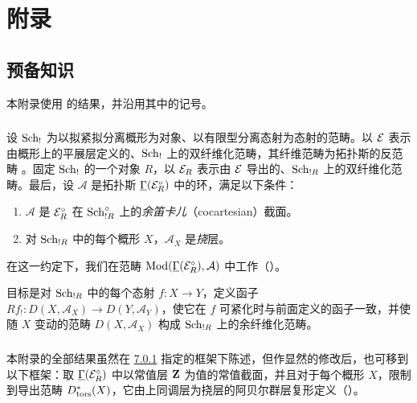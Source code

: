 \section{附录}\pageoriginale

\setcounter{subsection}{-1}
\subsection{预备知识}

本附录使用  的结果，并沿用其中的记号。

\subsubsection{}
设 $\operatorname{Sch}_{!}$ 为以拟紧拟分离概形为对象、以有限型分离态射为态射的范畴。以 ${\mathcal E}$ 表示由概形上的平展层定义的、$\operatorname{Sch}_{!}$ 上的双纤维化范畴，其纤维范畴为拓扑斯的反范畴 。固定 $\operatorname{Sch}_{!}$ 的一个对象 $R$，以 ${\mathcal E}_{R}$ 表示由 ${\mathcal E}$ 导出的、$\operatorname{Sch}_{!R}$ 上的双纤维化范畴。最后，设 $\mathcal{A}$ 是拓扑斯 $\underline{\Gamma}({\mathcal E}^{\circ}_{R})$ 中的环，满足以下条件：
\begin{enumerate}
\renewcommand{\theenumi}{\roman{enumi}}
\renewcommand{\labelenumi}{(\theenumi)}
\item $\mathcal{A}$ 是 ${\mathcal E}^{\circ}_{R}$ 在 $\operatorname{Sch}^{\circ}_{!R}$ 上的\emph{余笛卡儿}（cocartesian）截面。

\item 对 $\operatorname{Sch}_{!R}$ 中的每个概形 $X$，$\mathcal{A}_{X}$ 是\emph{挠}层。
\end{enumerate}

在这一约定下，我们在范畴 $\protect\mathcal{\operatorname{Mod}}(\underline{\Gamma}({\mathcal E}^{\circ}_{R}),\mathcal{A})$ 中工作（）。

目标是对 $\operatorname{Sch}_{!R}$ 中的每个态射 $f:X\rightarrow Y$，定义函子 $Rf_{!}:D(X,\mathcal{A}_X)\rightarrow
D(Y,\mathcal{A}_{Y})$，使它在 $f$ 可紧化时与前面定义的函子一致，并使随 $X$ 变动的范畴 $D(X,\mathcal{A}_{X})$ 构成 $\operatorname{Sch}_{!R}$ 上的余纤维化范畴。

\subsubsection{}
本附录的全部结果虽然在 \hyperref[XVII.subsubsec7.0.1]{7.0.1} 指定的框架下陈述，但作显然的修改后，也可移到以下框架：取 $\underline{\Gamma}({\mathcal E}^{\circ}_{R})$ 中以常值层 $\mathbf{Z}$ 为值的常值截面，并且对于每个概形 $X$，限制到导出范畴 $D^{\ast}_{\operatorname{tors}}(X)$，它由上同调层为挠层的阿贝尔群层复形定义（）。

